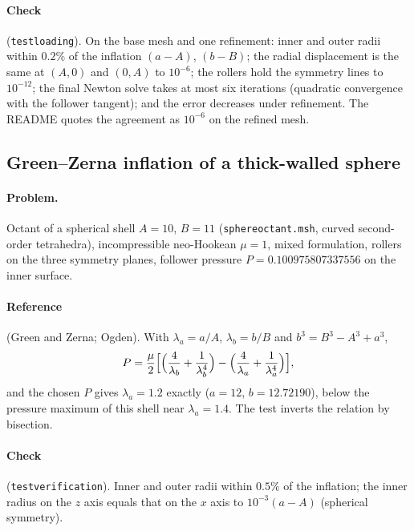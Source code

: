 \documentclass[11pt]{article}
\DeclareRobustCommand{\file}[1]{{\def\_{\textunderscore\allowbreak}\texttt{#1}}}
\begin{document}
\paragraph{Check} (\file{test\_loading}).  On the base mesh and one
refinement: inner and outer radii within $0.2\%$ of the inflation
$(a - A)$, $(b - B)$; the radial displacement is the same at $(A, 0)$ and
$(0, A)$ to $10^{-6}$; the rollers hold the symmetry lines to $10^{-12}$;
the final Newton solve takes at most six iterations (quadratic convergence
with the follower tangent); and the error decreases under refinement.  The
README quotes the agreement as $10^{-6}$ on the refined mesh.

\subsection{Green--Zerna inflation of a thick-walled sphere}
\label{sec:greenzerna}

\paragraph{Problem.}
Octant of a spherical shell $A = 10$, $B = 11$ (\file{sphere\_octant.msh},
curved second-order tetrahedra), incompressible neo-Hookean $\mu = 1$,
mixed formulation, rollers on the three symmetry planes, follower pressure
$P = 0.100975807337556$ on the inner surface.

\paragraph{Reference} (Green and Zerna; Ogden).  With $\lambda_a = a/A$,
$\lambda_b = b/B$ and $b^3 = B^3 - A^3 + a^3$,
\begin{equation}
  P = \frac{\mu}{2}\Bigl[\Bigl(\frac4{\lambda_b} + \frac1{\lambda_b^4}\Bigr) - \Bigl(\frac4{\lambda_a} + \frac1{\lambda_a^4}\Bigr)\Bigr],
\end{equation}
and the chosen $P$ gives $\lambda_a = 1.2$ exactly ($a = 12$,
$b = 12.72190$), below the pressure maximum of this shell near
$\lambda_a = 1.4$.  The test inverts the relation by bisection.

\paragraph{Check} (\file{test\_verification}).  Inner and outer radii
within $0.5\%$ of the inflation; the inner radius on the $z$ axis equals
that on the $x$ axis to $10^{-3}(a - A)$ (spherical symmetry).
\end{document}
